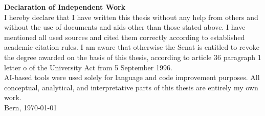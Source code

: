 \documentclass[12pt,a4paper]{article}
\begin{document}
\newpage

\thispagestyle{empty}
\vspace*{1cm}

{\bf \huge Declaration of Independent Work} \\[0.4cm]

I hereby declare that I have written this thesis without any help from others and without the use of documents and aids other than those stated above. I have mentioned all used sources and cited them correctly according to established academic citation rules. I am aware that otherwise the Senat is entitled to revoke the degree awarded on the basis of this thesis, according to article 36 paragraph 1 letter o of the University Act from 5 September 1996. \\[0.5cm]

AI-based tools were used solely for language and code improvement purposes. All conceptual, analytical, and interpretative parts of this thesis are entirely my own work. \\[1.0cm]

Bern, \today \hfill \makebox[6cm]{\hrulefill} \\[-0.2cm]
\end{document}
